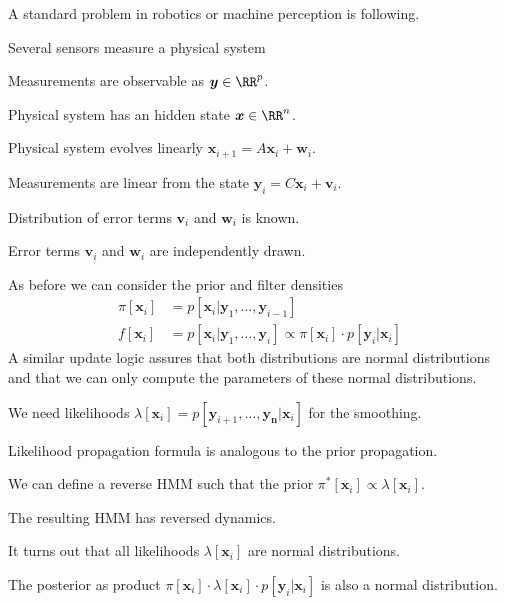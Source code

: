 \documentclass[landscape,footrule]{foils}
\renewcommand{\vec}[1]{\boldsymbol{#1}}
\begin{document}

A standard problem in robotics or machine perception is following.
\begin{triangles}
\item Several sensors measure a physical system
\item Measurements are observable as $\vec{y}\in\RR^p$.
\item Physical system has an hidden state $\vec{x}\in\RR^n$.
\item Physical system evolves linearly $\vec{x}_{i+1}=A\vec{x}_i+\vec{w}_i$.
\item Measurements are linear from the state $\vec{y}_{i}=C\vec{x}_i+\vec{v}_i$.
\item Distribution of error terms $\vec{v}_i$ and $\vec{w}_i$ is known.  
\item Error terms $\vec{v}_i$ and $\vec{w}_i$ are independently drawn.
\end{triangles}



As before we can consider the prior and filter densities
\begin{align*}
\pi[\vec{x}_i]&=p[\vec{x}_i|\vec{y}_1,\ldots, \vec{y}_{i-1}]\\
f[\vec{x}_i]&=p[\vec{x}_i|\vec{y}_1,\ldots, \vec{y}_{i}]\propto \pi[\vec{x}_i]\cdot p[\vec{y}_i|\vec{x}_i]
\end{align*}
A similar update logic assures that both distributions are normal distributions and that we can only compute the parameters of these normal distributions. 
 


\begin{triangles}
\item We need likelihoods $\lambda[\vec{x}_i]=p[\vec{y}_{i+1},\ldots, \vec{y_n}|\vec{x}_i]$ for the smoothing.
\item Likelihood propagation formula is analogous to the prior propagation.
\item We can define a reverse HMM such that the prior $\pi^*[\vec{x}_i]\propto \lambda[\vec{x}_i]$.
\item The resulting HMM has reversed dynamics. 
\item It turns out that all likelihoods $\lambda[\vec{x}_i]$ are normal distributions.
\item The posterior as product $\pi[\vec{x}_i]\cdot \lambda[\vec{x}_i]\cdot p[\vec{y}_i|\vec{x}_i]$ is also a normal distribution.
\end{triangles}
\end{document}
